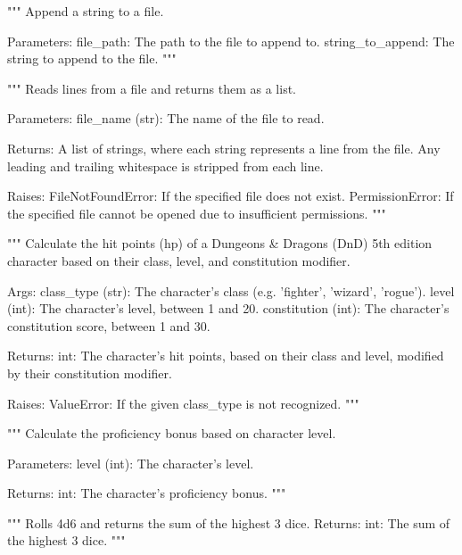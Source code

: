 \begin{codebox}
"""
Append a string to a file.

Parameters:
    file_path: The path to the file to append to.
    string_to_append: The string to append to the file.
"""
\end{codebox}

\begin{codebox}
"""
Reads lines from a file and returns them as a list.

Parameters:
    file_name (str): The name of the file to read.

Returns:
    A list of strings, where each string represents a line from the file.
    Any leading and trailing whitespace is stripped from each line.

Raises:
    FileNotFoundError: If the specified file does not exist.
    PermissionError: If the specified file cannot be opened due to insufficient permissions.
"""
\end{codebox}

\begin{codebox}
"""
Calculate the hit points (hp) of a Dungeons & Dragons (DnD) 5th edition character
based on their class, level, and constitution modifier.

Args:
    class_type (str): The character's class (e.g. 'fighter', 'wizard', 'rogue').
    level (int): The character's level, between 1 and 20.
    constitution (int): The character's constitution score, between 1 and 30.

Returns:
    int: The character's hit points, based on their class and level, modified by their
       constitution modifier.

Raises:
    ValueError: If the given class_type is not recognized.
"""
\end{codebox}

\begin{codebox}
"""
Calculate the proficiency bonus based on character level.

Parameters:
    level (int): The character's level.

Returns:
    int: The character's proficiency bonus.
"""
\end{codebox}

\begin{codebox}
"""
Rolls 4d6 and returns the sum of the highest 3 dice.
Returns:
    int: The sum of the highest 3 dice.
"""
\end{codebox}

